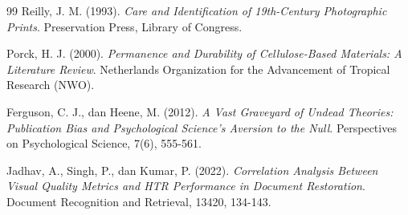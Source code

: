 \documentclass[12pt,a4paper]{book}
\begin{document}
\begin{thebibliography}{99}
Reilly, J. M. (1993).
\textit{Care and Identification of 19th-Century Photographic Prints}.
Preservation Press, Library of Congress.

Porck, H. J. (2000).
\textit{Permanence and Durability of Cellulose-Based Materials: A Literature Review}.
Netherlands Organization for the Advancement of Tropical Research (NWO).


Ferguson, C. J., dan Heene, M. (2012).
\textit{A Vast Graveyard of Undead Theories: Publication Bias and Psychological Science's Aversion to the Null}.
Perspectives on Psychological Science, 7(6), 555-561.

Jadhav, A., Singh, P., dan Kumar, P. (2022).
\textit{Correlation Analysis Between Visual Quality Metrics and HTR Performance in Document Restoration}.
Document Recognition and Retrieval, 13420, 134-143.

\end{thebibliography}
\end{document}
